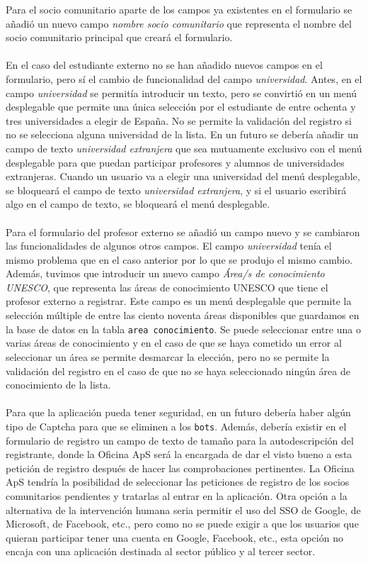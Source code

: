 \documentclass[11pt]{book}
\begin{document}
	Para el socio comunitario aparte de los campos ya existentes en el formulario se añadió un nuevo campo \emph{nombre socio comunitario} que representa el nombre del socio comunitario principal que creará el formulario.\\\\
	En el caso del estudiante externo no se han añadido nuevos campos en el formulario, pero sí el cambio de funcionalidad del campo \emph{universidad}. Antes, en el campo \emph{universidad} se permitía introducir un texto, pero se convirtió en un menú desplegable que permite una única selección por el estudiante de entre ochenta y tres universidades a elegir de España. No se permite la validación del registro si no se selecciona alguna universidad de la lista. En un futuro se debería añadir un campo de texto \emph{universidad extranjera} que sea mutuamente exclusivo con el menú desplegable para que puedan participar profesores y alumnos de universidades extranjeras. Cuando un usuario va a elegir una universidad del menú desplegable, se bloqueará el campo de texto \emph{universidad extranjera}, y si el usuario escribirá algo en el campo de texto, se bloqueará el menú desplegable. \\\\
	Para el formulario del profesor externo se añadió un campo nuevo y se cambiaron las funcionalidades de algunos otros campos. El campo \emph{universidad} tenía el mismo problema que en el caso anterior por lo que se produjo el mismo cambio. Además, tuvimos que introducir un nuevo campo \emph{Área/s de conocimiento UNESCO}, que representa las áreas de conocimiento UNESCO que tiene el profesor externo a registrar. Este campo es un menú desplegable que permite la selección múltiple de entre las ciento noventa áreas disponibles que guardamos en la base de datos en la tabla \texttt{area conocimiento}. Se puede seleccionar entre una o varias áreas de conocimiento y en el caso de que se haya cometido un error al seleccionar un área se permite desmarcar la elección, pero no se permite la validación del registro en el caso de que no se haya seleccionado ningún área de conocimiento de la lista.\\\\
	Para que la aplicación pueda tener seguridad, en un futuro debería haber algún tipo de Captcha para que se eliminen a los \texttt{bots}. Además, debería existir en el formulario de registro un campo de texto de tamaño para la autodescripción del registrante, donde la Oficina ApS será la encargada de dar el visto bueno a esta petición de registro después de hacer las comprobaciones pertinentes. La Oficina ApS tendría la posibilidad de seleccionar las peticiones de registro de los socios comunitarios pendientes y tratarlas al entrar en la aplicación. Otra opción a la alternativa de la intervención humana seria permitir el uso del SSO de Google, de Microsoft, de Facebook, etc., pero como no se puede exigir a que los usuarios que quieran participar tener una cuenta en Google, Facebook, etc., esta opción no encaja con una aplicación destinada al sector público y al tercer sector.\\\\
\end{document}
